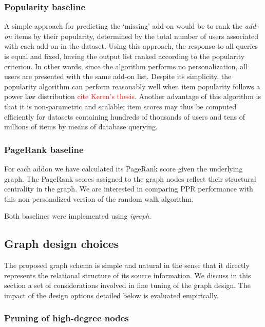 \documentclass[11pt,oneside]{book}
\let\Oldsubsection\subsection
\renewcommand{\subsection}{\FloatBarrier\Oldsubsection}
\let\Oldsubsubsection\subsubsection
\renewcommand{\subsubsection}{\FloatBarrier\Oldsubsubsection}
\begin{document}
\subsubsection{Popularity baseline} 
A simple approach for predicting the `missing' add-on would be to rank the {\it add-on} items by their popularity, determined by the total number of users associated with each add-on in the dataset. Using this approach, the response to all queries is equal and fixed, having the output list ranked according to the popularity criterion. In other words, since the algorithm performs no personalization, all users are presented with the same
add-on list. Despite its simplicity, the popularity algorithm can perform reasonably well when item popularity follows a power law distribution  \textcolor{red}{cite Keren's thesis}. Another advantage of this algorithm is that it is non-parametric and scalable; item scores may thus be computed efficiently for datasets containing hundreds of thousands of users and tens of millions of items by means of database querying. 

\subsubsection{PageRank baseline} 
For each addon we have calculated its PageRank score given the underlying graph. The PageRank scores assigned to the graph nodes 
reflect their structural centrality in the graph. We are interested in comparing PPR performance with this non-personalized version of the random walk algorithm.

Both baselines were implemented using {\it igraph}. 

\subsection{Graph design choices}
\label{sec:design}

The proposed graph schema is simple and natural in the sense that it directly represents the relational structure of its source information. We discuss in this section a set of considerations involved in fine tuning of the graph design. The impact of the design options detailed below is evaluated empirically.  

\subsubsection{Pruning of high-degree nodes} 
\end{document}
